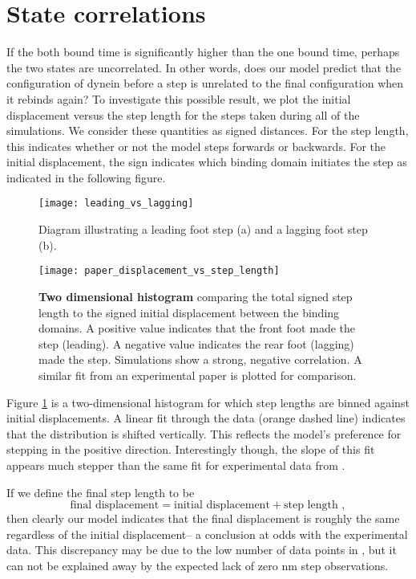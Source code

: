 \section{State correlations}
If the both bound time is significantly higher than the one bound time, perhaps the two states are uncorrelated. In other words, does our model predict that the configuration of dynein before a step is unrelated to the final configuration when it rebinds again? To investigate this possible result, we plot the initial displacement versus the step length for the steps taken during all of the simulations. We consider these quantities as signed distances. For the step length, this indicates whether or not the model steps forwards or backwards. For the initial displacement, the sign indicates which binding domain initiates the step as indicated in the following figure. 
\begin{figure}[!hbt]
	\centering
	\texttt{[image: leading\_vs\_lagging]}
	\caption[Leading vs Lagging Steps]{Diagram illustrating a leading foot step (a) and a lagging foot step (b).}
\end{figure}



 
\begin{figure}[!hbt]
	\centering
	\texttt{[image: paper\_displacement\_vs\_step\_length]}
	\caption[Initial displacement vs Step Length]{\textbf{Two dimensional histogram} comparing the total signed step length to
			the signed initial displacement between the binding domains. A positive value
			indicates that the front foot made the step (leading). A negative value
			indicates the rear foot (lagging) made the step. Simulations show a strong,
			negative correlation. A similar fit from an experimental paper is plotted for comparison.}
	\label{fig:displacement_vs_step_length}
\end{figure}
	
Figure \ref{fig:displacement_vs_step_length} is a two-dimensional histogram for which step lengths are binned against initial displacements. A linear fit through the data (orange dashed line) indicates that the distribution is shifted vertically. This reflects the model's preference for stepping in the positive direction. Interestingly though, the slope of this fit appears much stepper than the same fit for experimental data from \cite{dewitt2012cytoplasmic}. 

If we define the final step length to be 
\begin{equation}
\text{final displacement} = \text{initial displacement} + \text{step length },
\end{equation}	
then clearly our model indicates that the final displacement is roughly the same regardless of the initial displacement-- a conclusion at odds with the experimental data. This discrepancy may be due to the low number of data points in \cite{dewitt2012cytoplasmic}, but it can not be explained away by the expected lack of zero nm step observations. 



